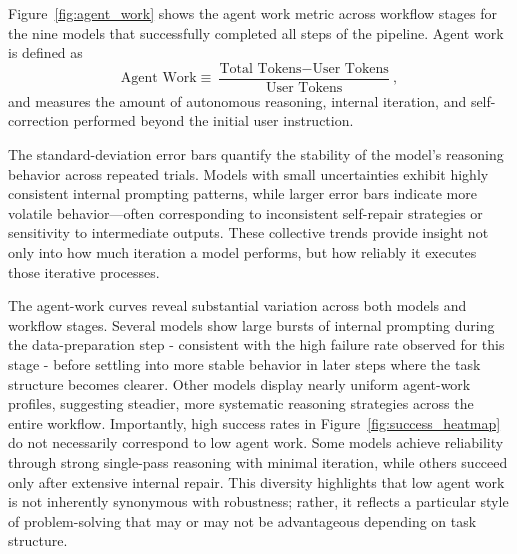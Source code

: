 \documentclass[aps,prd,reprint,superscriptaddress]{revtex4-2}
\begin{document}
Figure~\ref{fig:agent_work} shows the agent work metric across workflow stages for the nine models that successfully completed all steps of the pipeline. Agent work is defined as
\begin{equation*}
    \text{Agent Work}\equiv\frac{\text{Total Tokens}-\text{User Tokens}}{\text{User Tokens}},
\end{equation*}
and measures the amount of autonomous reasoning, internal iteration, and self-correction performed beyond the initial user instruction.

The standard-deviation error bars quantify the stability of the model’s reasoning behavior across repeated trials. Models with small uncertainties exhibit highly consistent internal prompting patterns, while larger error bars indicate more volatile behavior—often corresponding to inconsistent self-repair strategies or sensitivity to intermediate outputs. These collective trends provide insight not only into how much iteration a model performs, but how reliably it executes those iterative processes.

The agent-work curves reveal substantial variation across both models and workflow stages. Several models show large bursts of internal prompting during the data-preparation step - consistent with the high failure rate observed for this stage - before settling into more stable behavior in later steps where the task structure becomes clearer. Other models display nearly uniform agent-work profiles, suggesting steadier, more systematic reasoning strategies across the entire workflow. Importantly, high success rates in Figure~\ref{fig:success_heatmap} do not necessarily correspond to low agent work. Some models achieve reliability through strong single-pass reasoning with minimal iteration, while others succeed only after extensive internal repair. This diversity highlights that low agent work is not inherently synonymous with robustness; rather, it reflects a particular style of problem-solving that may or may not be advantageous depending on task structure.
\end{document}
